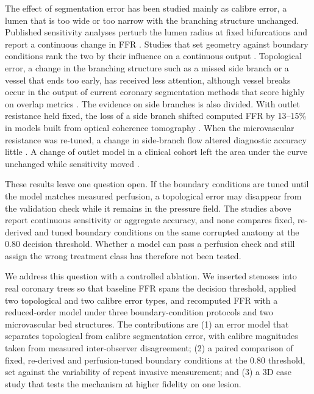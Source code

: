 The effect of segmentation error has been studied mainly as calibre error, a lumen that is too wide or too narrow
with the branching structure unchanged. Published sensitivity analyses perturb the lumen radius at fixed
bifurcations and report a continuous change in FFR \cite{sankaran2015tmi,sankaran2015cmame,fernandez2024,dalmaso2025}.
Studies that set geometry against boundary conditions rank the two by their influence on a continuous output
\cite{sankaran2016,tanade2022,colebank2019,korte2023}. Topological error, a change in the branching structure such
as a missed side branch or a vessel that ends too early, has received less attention, although vessel breaks occur
in the output of current coronary segmentation methods that score highly on overlap metrics \cite{bransby2026}.
The evidence on side branches is also divided. With outlet resistance held fixed, the loss of a side branch shifted
computed FFR by 13--15\% in models built from optical coherence tomography \cite{gamage2022}. When the microvascular
resistance was re-tuned, a change in side-branch flow altered diagnostic accuracy little \cite{gosling2020}. A change
of outlet model in a clinical cohort left the area under the curve unchanged while sensitivity moved
\cite{fossan2026}.

These results leave one question open. If the boundary conditions are tuned until the model matches measured
perfusion, a topological error may disappear from the validation check while it remains in the pressure field. The
studies above report continuous sensitivity or aggregate accuracy, and none compares fixed, re-derived and tuned
boundary conditions on the same corrupted anatomy at the 0.80 decision threshold. Whether a model can pass a
perfusion check and still assign the wrong treatment class has therefore not been tested.

We address this question with a controlled ablation. We inserted stenoses into real coronary trees so that baseline
FFR spans the decision threshold, applied two topological and two calibre error types, and recomputed FFR with a
reduced-order model under three boundary-condition protocols and two microvascular bed structures. The contributions
are (1) an error model that separates topological from calibre segmentation error, with calibre magnitudes taken
from measured inter-observer disagreement; (2) a paired comparison of fixed, re-derived and perfusion-tuned boundary
conditions at the 0.80 threshold, set against the variability of repeat invasive measurement; and (3) a 3D case
study that tests the mechanism at higher fidelity on one lesion.

